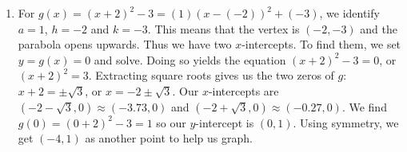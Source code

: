 \documentclass{ximera}
\begin{document}
\begin{example}
\begin{explanation}
\begin{enumerate}
\begin{center}
\begin{image}
\end{image}
\end{center}

From the graph, we get that the range is $[0, \infty)$ and see that $f$ has the minimum value of $0$ at $x = 3$ and no maximum.  Also, $f$ is decreasing on $(-\infty, 3]$ and increasing on $[3, \infty)$.  %



\item For $g(x) = (x+2)^2 - 3 = (1)(x-(-2))^2+(-3)$, we identify $a = 1$, $h = -2$ and $k = -3$.  This means that the vertex is $(-2,-3)$ and the parabola opens upwards.  Thus we have two $x$-intercepts. To find them, we set $y = g(x) = 0$ and solve.  Doing so yields the equation $(x+2)^2 - 3 = 0$, or $(x+2)^2 = 3$.  Extracting square roots gives us the two zeros of $g$:  $x + 2 = \pm \sqrt{3}$, or $x = -2 \pm \sqrt{3}$.  Our $x$-intercepts are $(-2-\sqrt{3}, 0) \approx (-3.73, 0)$ and $(-2+\sqrt{3}, 0) \approx (-0.27, 0)$.  We find $g(0) = (0+2)^2-3 = 1$ so our $y$-intercept is $(0,1)$.  Using symmetry, we get $(-4,1)$ as another point to help us graph.  


\end{enumerate}
\end{explanation}
\end{example}
\end{document}
